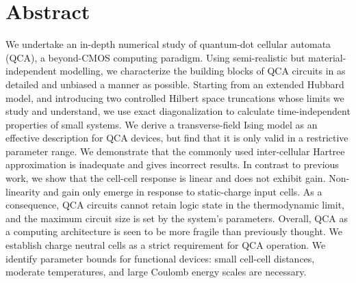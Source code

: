 \chapter*{Abstract}

\begin{doublespace}
We undertake an in-depth numerical study of quantum-dot cellular automata (QCA),
a beyond-CMOS computing paradigm. Using semi-realistic but material-independent
modelling, we characterize the building blocks of QCA circuits in as detailed
and unbiased a manner as possible. Starting from an extended Hubbard model, and
introducing two controlled Hilbert space truncations whose limits we study
and understand, we use exact diagonalization to calculate time-independent
properties of small systems. We derive a transverse-field Ising model as an
effective description for QCA devices, but find that it is only valid in a
restrictive parameter range. We demonstrate that the commonly used
inter-cellular Hartree approximation is inadequate and gives incorrect results.
In contrast to previous work, we show that the cell-cell response is linear and
does not exhibit gain. Non-linearity and gain only emerge in response to
static-charge input cells. As a consequence, QCA circuits cannot retain logic
state in the thermodynamic limit, and the maximum circuit size is set by the
system's parameters. Overall, QCA as a computing architecture is seen to be more
fragile than previously thought. We establish charge neutral cells as a strict
requirement for QCA operation. We identify parameter bounds for functional
devices: small cell-cell distances, moderate temperatures, and large Coulomb
energy scales are necessary.
\end{doublespace}
